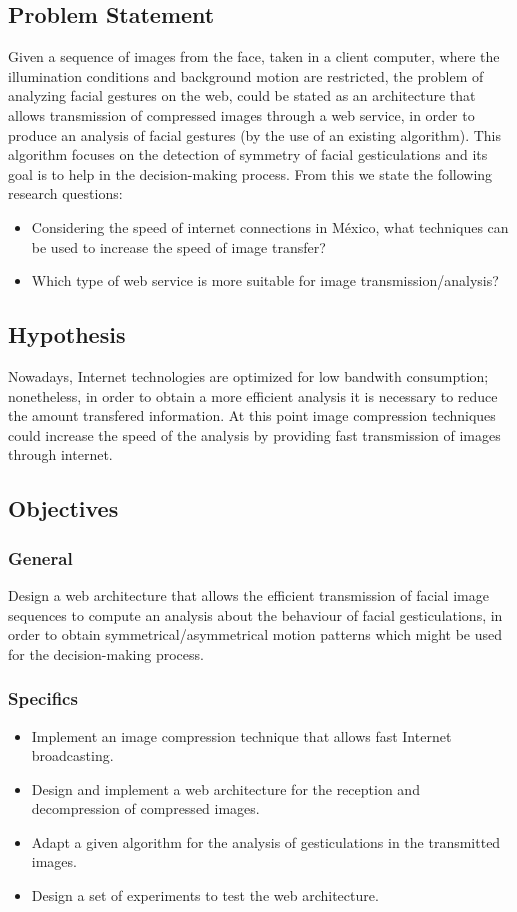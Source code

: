 \documentclass[12pt,letterpaper,titlepage]{article}
\begin{document}
\subsection{Problem Statement}
Given a sequence of images from the face, taken in a client computer, where the illumination conditions and background motion are restricted, the problem of analyzing facial gestures on the web, could be stated as an architecture that allows transmission of compressed images through a web service, in order to produce an analysis of facial gestures (by the use of an existing algorithm). This algorithm focuses on the detection of symmetry of facial gesticulations and its goal is to help in the decision-making process. From this we state the following research questions:
\begin{itemize}
\item Considering the speed of internet connections in M\'exico, what techniques can be used to increase the speed of image transfer?
\item Which type of web service is more suitable for image transmission/analysis?
\end{itemize}

\subsection{Hypothesis}
Nowadays, Internet technologies %
are optimized for low bandwith consumption; nonetheless, in order to obtain a more efficient analysis it is necessary to reduce the amount transfered information. At this point image compression techniques could increase the speed of the analysis by providing fast transmission of images through internet.

\subsection{Objectives}
\subsubsection{General}
Design a web architecture that allows the efficient transmission of facial image sequences to compute an analysis about the behaviour of facial gesticulations, in order to obtain symmetrical/asymmetrical motion patterns which might be used for the decision-making process.
\subsubsection{Specifics}
\begin{itemize}
\item Implement an image compression technique that allows fast Internet broadcasting.
\item Design and implement a web architecture for the reception and decompression of compressed images.
\item Adapt a given algorithm for the analysis of gesticulations in the transmitted images.
\item Design a set of experiments to test the web architecture.
\end{itemize}
\end{document}
